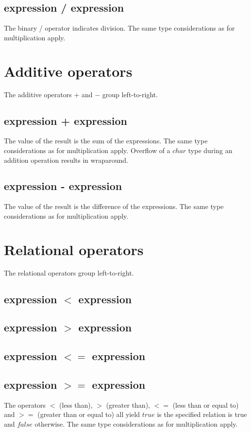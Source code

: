\begin{homeworkProblem}
    \subsection{expression / expression}
    The binary / operator indicates division. The same type considerations as for multiplication apply.

    \section{Additive operators}
    The additive operators + and − group left-to-right.

    \subsection{expression + expression}
    The value of the result is the sum of the expressions. The same type considerations as for multiplication apply. Overflow of a $char$ type during an addition operation results in wraparound.

    \subsection{expression - expression}
    The value of the result is the difference of the expressions. The same type considerations as for multiplication apply.

    \section{Relational operators}
    The relational operators group left-to-right.
    
    \subsection{expression $<$ expression}
    \subsection{expression $>$ expression}
    \subsection{expression $<=$ expression}
    \subsection{expression $>=$ expression}
    The operators $<$ (less than), $>$ (greater than), $<=$ (less than or equal to) and $>=$ (greater than or equal to) all yield $true$ is the specified relation is true and $false$ otherwise. The same type considerations as for multiplication apply.


\end{homeworkProblem}
